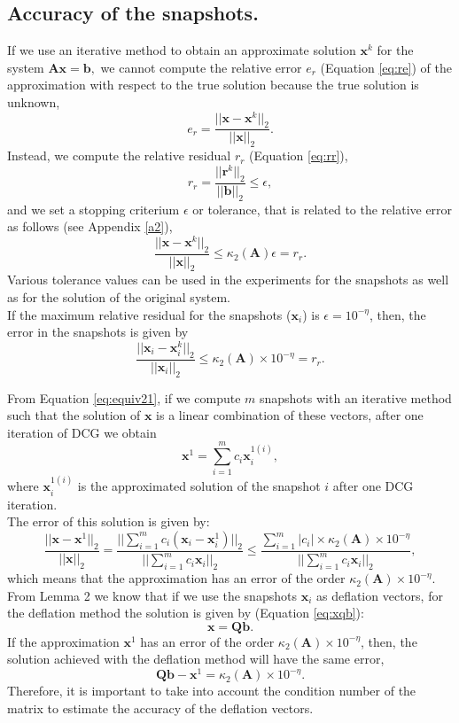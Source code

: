 \documentclass[review]{elsarticle}
\begin{document}
\subsection{Accuracy of the snapshots.}\label{accs}
If we use an iterative method to obtain an approximate solution $\mathbf{x}^k$ for the system $\mathbf{A}\mathbf{x}=\mathbf{b},$ we cannot compute the relative error $e_r$
(Equation \eqref{eq:re}) of the approximation with respect to the true solution because the true solution is unknown, 
\begin{equation}\label{eq:re}
 e_r=\frac{||\mathbf{x}-\mathbf{x}^k||_2}{||\mathbf{x}||_2}.
\end{equation}
Instead, we compute the relative residual $r_r$ (Equation \eqref{eq:rr}), 
\begin{equation}\label{eq:rr}
r_r= \frac{||\mathbf{r}^k||_2}{||\mathbf{b}||_2}\leq \epsilon,
\end{equation}
and we set a stopping criterium $\epsilon$ or tolerance, that is related to the relative error as follows \cite{Saad03} (see Appendix \ref{a2}),
$$\frac{||\mathbf{x}-\mathbf{x}^k||_2}{||\mathbf{x}||_2}\leq \kappa_2(\mathbf{A}) \epsilon=r_r.$$
Various tolerance values can be used in the experiments for the snapshots as well as for the solution of the original system. \\
If the maximum relative residual for the snapshots ($\mathbf{x}_i$) is $\epsilon=10^{-\eta}$, then, the error in the snapshots is given by
$$\frac{||\mathbf{x}_i-\mathbf{x}_i^k||_2}{||\mathbf{x}_i||_2}\leq \kappa_2(\mathbf{A})\times 10^{-\eta}=r_r.$$

From Equation \eqref{eq:equiv21}, if we compute $m$ snapshots with an iterative method such that the solution of $\mathbf{x}$ is a linear combination of these vectors, after one iteration of DCG we obtain
$$\mathbf{x}^{1}=\sum_{i=1}^m {c}_i\mathbf{x}_i^{1(i)},$$
where $\mathbf{x}_i^{1(i)}$ is the approximated solution of the snapshot $i$ after one DCG iteration.\\ 
The error of this solution is given by:
$$\frac{||\mathbf{x}-\mathbf{x}^1||_2}{||\mathbf{x}||_2}=
\frac{||\sum_{i=1}^m {c}_i(\mathbf{x}_i-\mathbf{x}_i^{1})||_2}{||\sum_{i=1}^m {c}_i\mathbf{x}_i||_2}\leq
\frac{\sum_{i=1}^m| {c}_i|\times \kappa_2(\mathbf{A})\times 10^{-\eta}}{||\sum_{i=1}^m {c}_i\mathbf{x}_i||_2},
$$
which means that the approximation has an error of the order $\kappa_2(\mathbf{A})\times10^{-\eta}.$
\\From Lemma 2 we know that if we use the snapshots $\mathbf{x}_i$ as deflation vectors, for the deflation method the solution is given by (Equation \eqref{eq:xqb}): $$\mathbf{x}=\mathbf{Q}\mathbf{b}.$$ 
If the approximation $\mathbf{x}^1$ has an error of the order $\kappa_2(\mathbf{A})\times10^{-\eta}$, then, the solution achieved with the deflation method will have the same error, 
$$\mathbf{Q}\mathbf{b}-\mathbf{x}^1=\kappa_2(\mathbf{A})\times10^{-\eta}.$$
Therefore, it is important to take into account the condition number of the matrix to estimate the accuracy of the deflation vectors.
\end{document}
